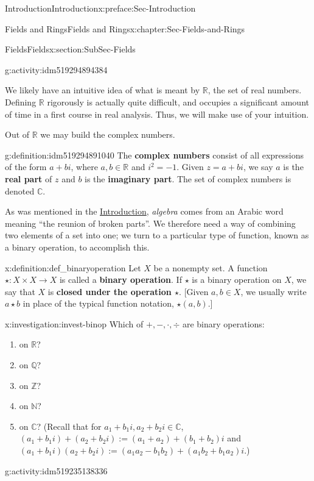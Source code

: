 \documentclass[oneside,10pt,]{book}
\newcommand{\terminology}[1]{\textbf{#1}}
\numberwithin{equation}{section}
\def\C{{\mathbb C}}
\def\Z{{\mathbb Z}}
\def\Q{{\mathbb Q}}
\def\N{{\mathbb N}}
\def\R{{\mathbb R}}
\begin{document}
\begin{preface}{Introduction}{}{Introduction}{}{}{x:preface:Sec-Introduction}
\begin{chapterptx}{Fields and Rings}{}{Fields and Rings}{}{}{x:chapter:Sec-Fields-and-Rings}
\begin{sectionptx}{Fields}{}{Fields}{}{}{x:section:SubSec-Fields}
\begin{activity}{}{g:activity:idm519294894384}
\end{activity}
We likely have an intuitive idea of what is meant by \(\R\), the set of real numbers. Defining \(\R\) rigorously is actually quite difficult, and occupies a significant amount of time in a first course in real analysis. Thus, we will make use of your intuition. %
\par
Out of \(\R\) we may build the complex numbers.%
\begin{definition}{}{g:definition:idm519294891040}%
The \terminology{complex numbers} consist of all expressions of the form \(a+bi\), where \(a,b\in \R\) and \(i^2 = -1\). Given \(z = a+bi\), we say \(a\) is the \terminology{real part} of \(z\) and \(b\) is the \terminology{imaginary part}. The set of complex numbers is denoted \(\C\).%
\end{definition}
As was mentioned in the \hyperref[x:preface:Sec-Introduction]{Introduction}, \emph{algebra} comes from an Arabic word meaning ``the reunion of broken parts''. We therefore need a way of combining two elements of a set into one; we turn to a particular type of function, known as a binary operation, to accomplish this.%
\begin{definition}{}{x:definition:def_binaryoperation}%
%
 Let \(X\) be a nonempty set. A function \(\star : X \times X \to X\) is called a \terminology{binary operation}. If \(\star\) is a binary operation on \(X\), we say that \(X\) is \terminology{closed under the operation \(\star\)}. [Given \(a,b\in X\), we usually write \(a\star b\) in place of the typical function notation, \(\star(a,b)\).]%
\end{definition}
\begin{investigation}{}{x:investigation:invest-binop}%
Which of \(+, -, \cdot, \div\) are binary operations:%
\begin{enumerate}
\item{}on \(\R\)?%
\item{}on \(\Q\)?%
\item{}on \(\Z\)?%
\item{}on \(\N\)?%
\item{}on \(\C\)? (Recall that for \(a_1 + b_1 i, a_2 + b_2 i \in \C\), \((a_1 + b_1 i) + (a_2 + b_2 i) := (a_1 + a_2) + (b_1 + b_2)i\) and  \((a_1 + b_1 i)(a_2 + b_2 i) := (a_1 a_2 - b_1 b_2) + (a_1 b_2 + b_1 a_2) i\).)%
\end{enumerate}
%
\end{investigation}
\begin{activity}{}{g:activity:idm519235138336}%

\end{activity}
\end{sectionptx}
\end{chapterptx}
\end{preface}
\end{document}
